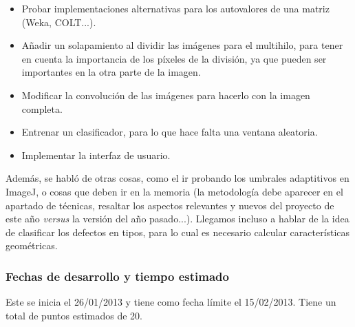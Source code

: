 \begin{itemize}
\item Probar implementaciones alternativas para los autovalores de una matriz (Weka, COLT...).
\item Añadir un solapamiento al dividir las imágenes para el multihilo, para tener en cuenta la importancia de los píxeles de la división, ya que pueden ser importantes en la otra parte de la imagen.
\item Modificar la convolución de las imágenes para hacerlo con la imagen completa.
\item Entrenar un clasificador, para lo que hace falta una ventana aleatoria.
\item Implementar la interfaz de usuario.
\end{itemize}

Además, se habló de otras cosas, como el ir probando los umbrales adaptitivos en ImageJ, o cosas que deben ir en la memoria (la metodología debe aparecer en el apartado de técnicas, resaltar los aspectos relevantes y nuevos del proyecto de este año \textit{versus} la versión del año pasado...). Llegamos incluso a hablar de la idea de clasificar los defectos en tipos, para lo cual es necesario calcular características geométricas.

\subsubsection*{Fechas de desarrollo y tiempo estimado}
Este \sprint{} se inicia el 26/01/2013 y tiene como fecha límite el 15/02/2013. Tiene un total de puntos estimados de 20.


